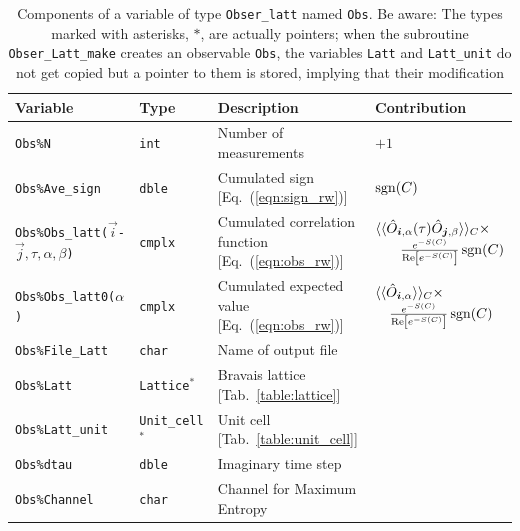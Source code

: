 \begin{table}[h!]
   \begin{center}
   \begin{tabular}{@{} p{}  l  p{} p{} @{}}\toprule
           Variable  &  Type      &  Description &  Contribution \\\midrule
           \texttt{Obs\%N}                       &  \texttt{int}        &   Number of measurements &    $+1$\\
           \texttt{Obs\%Ave\_sign} &  \texttt{dble}  &    Cumulated sign [Eq.~(\ref{eqn:sign_rw})] & $\operatorname{sgn}(C)$  \\
           \texttt{Obs\%Obs\_latt($\vec{i}$-$\vec{j},\allowbreak\tau,\alpha,\beta$)}        & \texttt{cmplx}      &    Cumulated correlation function [Eq.~(\ref{eqn:obs_rw})] & $ \begin{multlined}[t] \langle \langle \hat{O}_{\vec{i},\alpha} (\tau) \hat{O}_{\vec{j},\beta} \rangle \rangle_{C} \times\\[-0.5ex] \tfrac{e^{-S(C)}} {\Re \left[e^{-S(C)} \right]}  \sgn(C) \end{multlined}$  \\
           \texttt{Obs\%Obs\_latt0($\alpha$)}        & \texttt{cmplx}      &    Cumulated expected value [Eq.~(\ref{eqn:obs_rw})] &  $ \begin{multlined}[t] \langle \langle \hat{O}_{\vec{i},\alpha} \rangle \rangle_{C} \times\\[-0.5ex] \tfrac{e^{-S(C)}} {\Re \left[e^{-S(C)} \right]} \sgn(C) \end{multlined}$ \\
           \texttt{Obs\%File\_Latt}           &   \texttt{char}   &    Name of output file  &
           \\
           \texttt{Obs\%Latt} & \texttt{Lattice}$^*$ & Bravais lattice [Tab.~\ref{table:lattice}] & \\
           \texttt{Obs\%Latt\_unit} & \texttt{Unit\_cell}$^*$ & Unit cell [Tab.~\ref{table:unit_cell}] & \\
           \texttt{Obs\%dtau} & \texttt{dble} & Imaginary time step & \\
           \texttt{Obs\%Channel} & \texttt{char} & Channel for Maximum Entropy &
           \\\bottomrule
   \end{tabular}
   \caption{Components of a variable of type \texttt{Obser\_latt} named \texttt{Obs}.
   Be aware: The types marked with asterisks, $*$, are actually pointers; when the subroutine \texttt{Obser\_Latt\_make} creates an observable \texttt{Obs}, the variables \texttt{Latt} and \texttt{Latt\_unit} do not get copied but a pointer to them is stored, implying that their modification
}
\end{center}
\end{table}
